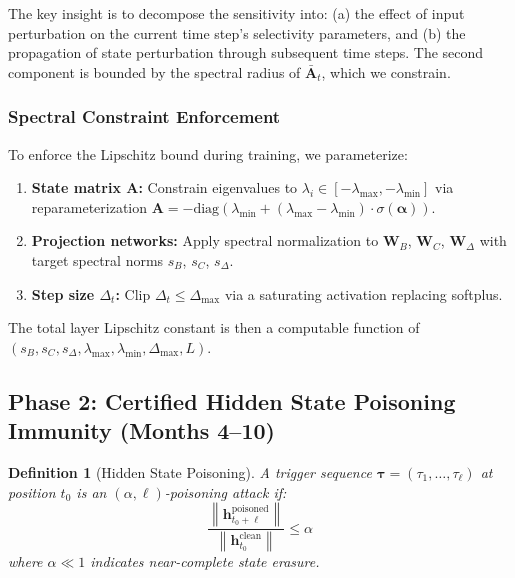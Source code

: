 \documentclass[12pt,a4paper]{article}
\newtheorem{definition}[theorem]{Definition}
\newcommand{\norm}[1]{\left\|#1\right\|}
\begin{document}
The key insight is to decompose the sensitivity into: (a) the effect of input perturbation on the current time step's selectivity parameters, and (b) the propagation of state perturbation through subsequent time steps. The second component is bounded by the spectral radius of $\bar{\mathbf{A}}_t$, which we constrain.

\subsubsection{Spectral Constraint Enforcement}

To enforce the Lipschitz bound during training, we parameterize:

\begin{enumerate}
    \item \textbf{State matrix $\mathbf{A}$:} Constrain eigenvalues to $\lambda_i \in [-\lambda_{\max}, -\lambda_{\min}]$ via reparameterization $\mathbf{A} = -\text{diag}(\lambda_{\min} + (\lambda_{\max} - \lambda_{\min}) \cdot \sigma(\boldsymbol{\alpha}))$.
    
    \item \textbf{Projection networks:} Apply spectral normalization to $\mathbf{W}_B$, $\mathbf{W}_C$, $\mathbf{W}_\Delta$ with target spectral norms $s_B$, $s_C$, $s_\Delta$.
    
    \item \textbf{Step size $\Delta_t$:} Clip $\Delta_t \leq \Delta_{\max}$ via a saturating activation replacing softplus.
\end{enumerate}

The total layer Lipschitz constant is then a computable function of $(s_B, s_C, s_\Delta, \lambda_{\max}, \lambda_{\min}, \Delta_{\max}, L)$.

\subsection{Phase 2: Certified Hidden State Poisoning Immunity (Months 4--10)}

\begin{definition}[Hidden State Poisoning]
A trigger sequence $\boldsymbol{\tau} = (\tau_1, \ldots, \tau_\ell)$ at position $t_0$ is an $(\alpha, \ell)$-poisoning attack if:
\begin{equation}
    \frac{\norm{\mathbf{h}_{t_0+\ell}^{\text{poisoned}}}}{\norm{\mathbf{h}_{t_0}^{\text{clean}}}} \leq \alpha
\end{equation}
where $\alpha \ll 1$ indicates near-complete state erasure.
\end{definition}
\end{document}
